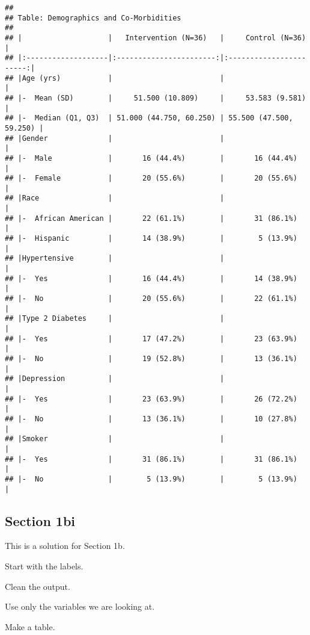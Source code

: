 \documentclass[]{article}
\begin{document}
\begin{verbatim}
## 
## Table: Demographics and Co-Morbidities
## 
## |                    |   Intervention (N=36)   |     Control (N=36)      |
## |:-------------------|:-----------------------:|:-----------------------:|
## |Age (yrs)           |                         |                         |
## |-  Mean (SD)        |     51.500 (10.809)     |     53.583 (9.581)      |
## |-  Median (Q1, Q3)  | 51.000 (44.750, 60.250) | 55.500 (47.500, 59.250) |
## |Gender              |                         |                         |
## |-  Male             |       16 (44.4%)        |       16 (44.4%)        |
## |-  Female           |       20 (55.6%)        |       20 (55.6%)        |
## |Race                |                         |                         |
## |-  African American |       22 (61.1%)        |       31 (86.1%)        |
## |-  Hispanic         |       14 (38.9%)        |        5 (13.9%)        |
## |Hypertensive        |                         |                         |
## |-  Yes              |       16 (44.4%)        |       14 (38.9%)        |
## |-  No               |       20 (55.6%)        |       22 (61.1%)        |
## |Type 2 Diabetes     |                         |                         |
## |-  Yes              |       17 (47.2%)        |       23 (63.9%)        |
## |-  No               |       19 (52.8%)        |       13 (36.1%)        |
## |Depression          |                         |                         |
## |-  Yes              |       23 (63.9%)        |       26 (72.2%)        |
## |-  No               |       13 (36.1%)        |       10 (27.8%)        |
## |Smoker              |                         |                         |
## |-  Yes              |       31 (86.1%)        |       31 (86.1%)        |
## |-  No               |        5 (13.9%)        |        5 (13.9%)        |
\end{verbatim}

\hypertarget{section-1bi}{%
\subsection{Section 1bi}\label{section-1bi}}

This is a solution for Section 1b.

Start with the labels.

Clean the output.

Use only the variables we are looking at.

Make a table.
\end{document}
